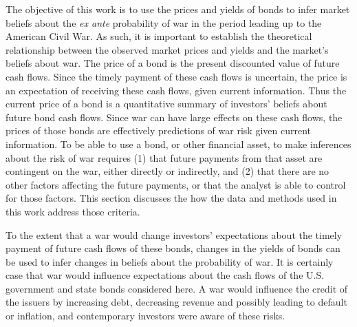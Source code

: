 \documentclass[]{article}\usepackage[]{graphicx}\usepackage[]{color}
\begin{document}
The objective of this work is to use the prices and yields of bonds to infer market beliefs about the \textit{ex ante} probability of war in the period leading up to the American Civil War.
As such, it is important to establish the theoretical relationship between the observed market prices and yields and the market's beliefs about war.
The price of a bond is the present discounted value of future cash flows.
Since the timely payment of these cash flows is uncertain, the price is an expectation of receiving these cash flows, given current information.
Thus the current price of a bond is a quantitative summary of investors' beliefs about future bond cash flows.
Since war can have large effects on these cash flows, the prices of those bonds are effectively predictions of war risk given current information.
To be able to use a bond, or other financial asset, to make inferences about the risk of war requires (1) that future payments from that asset are contingent on the war, either directly or indirectly, and (2) that there are no other factors affecting the future payments, or that the analyst is able to control for those factors.
This section discusses the how the data and methods used in this work address those criteria.

To the extent that a war would change investors' expectations about the timely payment of future cash flows of these bonds, changes in the yields of bonds can be used to infer changes in beliefs about the probability of war.
It is certainly case that war would influence expectations about the cash flows of the U.S. government and state bonds considered here.
A war would influence the credit of the issuers by increasing debt, decreasing revenue and possibly leading to default or inflation, and contemporary investors were aware of these risks.
\end{document}
